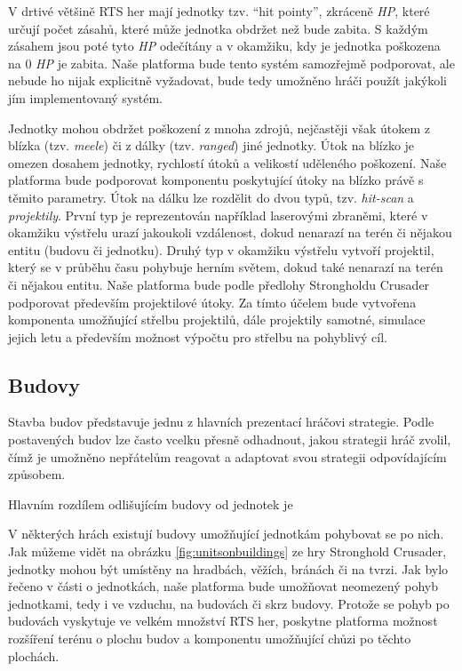 V drtivé většině RTS her mají jednotky tzv. ``hit pointy'', zkráceně \textit{HP}, které určují počet zásahů, které může jednotka obdržet než bude zabita. S každým zásahem jsou poté tyto \textit{HP} odečítány a v okamžiku, kdy je jednotka poškozena na 0 \textit{HP} je zabita. Naše platforma bude tento systém samozřejmě podporovat, ale nebude ho nijak explicitně vyžadovat, bude tedy umožněno hráči použít jakýkoli jím implementovaný systém. 

Jednotky mohou obdržet poškození z mnoha zdrojů, nejčastěji však útokem z blízka (tzv. \textit{meele}) či z dálky (tzv. \textit{ranged}) jiné jednotky. Útok na blízko je omezen dosahem jednotky, rychlostí útoků a velikostí uděleného poškození. Naše platforma bude podporovat komponentu poskytující útoky na blízko právě s těmito parametry. Útok na dálku lze rozdělit do dvou typů, tzv. \textit{hit-scan} a \textit{projektily}. První typ je reprezentován například laserovými zbraněmi, které v okamžiku výstřelu urazí jakoukoli vzdálenost, dokud nenarazí na terén či nějakou entitu (budovu či jednotku). Druhý typ v okamžiku výstřelu vytvoří projektil, který se v průběhu času pohybuje herním světem, dokud také nenarazí na terén či nějakou entitu. Naše platforma bude podle předlohy Strongholdu Crusader podporovat především projektilové útoky. Za tímto účelem bude vytvořena komponenta umožňující střelbu projektilů, dále projektily samotné, simulace jejich letu a především možnost výpočtu pro střelbu na pohyblivý cíl. 

\subsection{Budovy}
Stavba budov představuje jednu z hlavních prezentací hráčovi strategie. Podle postavených budov lze často vcelku přesně odhadnout, jakou strategii hráč zvolil, čímž je umožněno nepřátelům reagovat a adaptovat svou strategii odpovídajícím způsobem. 

Hlavním rozdílem odlišujícím budovy od jednotek je 


V některých hrách existují budovy umožňující jednotkám pohybovat se po nich. Jak můžeme vidět na obrázku \ref{fig:unitsonbuildings} ze hry Stronghold Crusader, jednotky mohou být umístěny na hradbách, věžích, bránách či na tvrzi. Jak bylo řečeno v části o jednotkách, naše platforma bude umožňovat neomezený pohyb jednotkami, tedy i ve vzduchu, na budovách či skrz budovy. Protože se pohyb po budovách vyskytuje ve velkém množství RTS her, poskytne platforma možnost rozšíření terénu o plochu budov a komponentu umožňující chůzi po těchto plochách.


